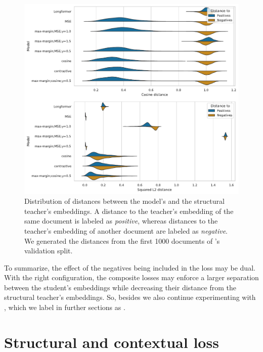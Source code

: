 \begin{figure}
  \includegraphics[width=\textwidth]{img/composite_distances.pdf}

  \caption{Distribution of distances between the model's and the structural
  teacher's embeddings. A distance to the teacher's embedding of the same
  document is labeled as \emph{positive}, whereas distances to the teacher's
  embedding of another document are labeled as \emph{negative}. We generated
  the distances from the first 1000 documents of 's
  validation split.}

  \label{fig:composite_distances}

\end{figure}

To summarize, the effect of the negatives being included in the loss may be
dual. With the right configuration, the composite losses may enforce a larger
separation between the student's embeddings while decreasing their
distance from the structural teacher's embeddings. So, besides
 we also continue experimenting with
, which we label in further sections as
.

\section{Structural and contextual loss}\label{section:structural_and_contextual}

